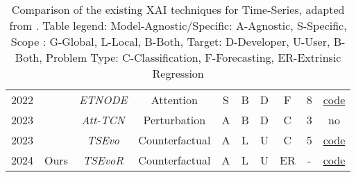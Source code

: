 \begin{table*}[H]
\begin{tabular}{@{}cccccccccc@{}}
    2022        &\cite{gao_explainable_2022}       &  \textit{ETNODE}  & Attention     &S       & B          & D      & F                        & 8                 & \href{https://github.com/PengleiGao/ETN-ODE}{code} \\  

    2023        &\cite{zhao_explainable_2023}                &\textit{Att-TCN}   & Perturbation             & A             & B             & D          & C                    & 3                 & no \\ 

    2023        & \cite{hollig_tsevo_2022}           & \textit{TSEvo}& Counterfactual           & A             & L             & U         & C                                 & 5                 & \href{https://github.com/fzi-forschungszentrum-informatik/TSInterpret}{code} \\
    \hline\hline

    2024        & Ours           & \textit{TSEvoR}& Counterfactual           & A             & L             & U         & ER                   & -                 & \href{https://github.com/AlexisTabin/BA-Estimation-TCN}{code} \\

    \bottomrule
  \end{tabular}
  \label{table:xai-survey}
  \caption{Comparison of the existing XAI techniques for Time-Series, adapted from \cite{rojat_explainable_2021}. Table legend: Model-Agnostic/Specific: A-Agnostic, S-Specific, Scope : G-Global, L-Local, B-Both, Target: D-Developer, U-User, B-Both, Problem Type: C-Classification, F-Forecasting, ER-Extrinsic Regression}
\end{table*}